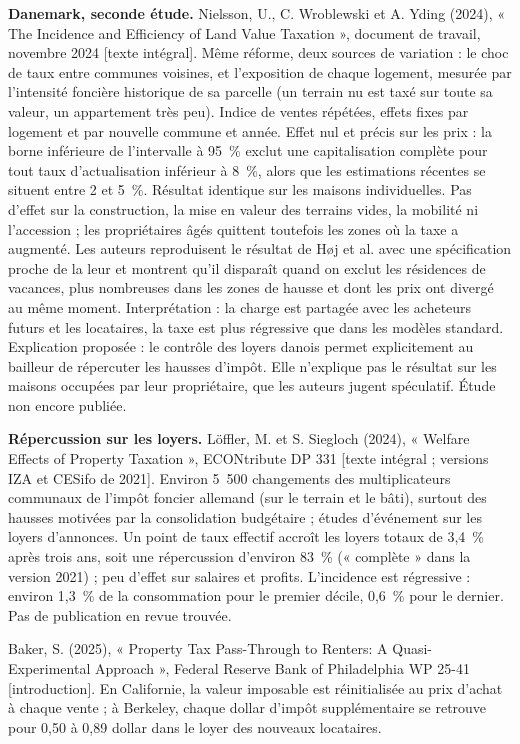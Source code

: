 \documentclass[11pt,a4paper]{article}
\newcommand{\lu}[1]{{\footnotesize\color{ocre}[#1]}}
\begin{document}
\textbf{Danemark, seconde étude.} Nielsson, U., C. Wroblewski et A. Yding (2024), « The Incidence
and Efficiency of Land Value Taxation », document de travail, novembre 2024 \lu{texte intégral}.
Même réforme, deux sources de variation : le choc de taux entre communes voisines, et
l'exposition de chaque logement, mesurée par l'intensité foncière historique de sa parcelle (un
terrain nu est taxé sur toute sa valeur, un appartement très peu). Indice de ventes répétées,
effets fixes par logement et par nouvelle commune et année. Effet nul et précis sur les prix : la
borne inférieure de l'intervalle à 95~\% exclut une capitalisation complète pour tout taux
d'actualisation inférieur à 8~\%, alors que les estimations récentes se situent entre 2 et 5~\%.
Résultat identique sur les maisons individuelles. Pas d'effet sur la construction, la mise en
valeur des terrains vides, la mobilité ni l'accession ; les propriétaires âgés quittent toutefois
les zones où la taxe a augmenté. Les auteurs reproduisent le résultat de Høj et al. avec une
spécification proche de la leur et montrent qu'il disparaît quand on exclut les résidences de
vacances, plus nombreuses dans les zones de hausse et dont les prix ont divergé au même moment.
Interprétation : la charge est partagée avec les acheteurs futurs et les locataires, la taxe est
plus régressive que dans les modèles standard. Explication proposée : le contrôle des loyers
danois permet explicitement au bailleur de répercuter les hausses d'impôt. Elle n'explique pas
le résultat sur les maisons occupées par leur propriétaire, que les auteurs jugent spéculatif.
Étude non encore publiée.

\textbf{Répercussion sur les loyers.} Löffler, M. et S. Siegloch (2024), « Welfare Effects of
Property Taxation », ECONtribute DP 331 \lu{texte intégral ; versions IZA et CESifo de 2021}.
Environ 5~500 changements des multiplicateurs communaux de l'impôt foncier allemand (sur le
terrain et le bâti), surtout des hausses motivées par la consolidation budgétaire ; études
d'événement sur les loyers d'annonces. Un point de taux effectif accroît les loyers totaux de
3,4~\% après trois ans, soit une répercussion d'environ 83~\% (« complète » dans la version 2021) ;
peu d'effet sur salaires et profits. L'incidence est régressive : environ 1,3~\% de la consommation
pour le premier décile, 0,6~\% pour le dernier. Pas de publication en revue trouvée.

Baker, S. (2025), « Property Tax Pass-Through to Renters: A Quasi-Experimental Approach »,
Federal Reserve Bank of Philadelphia WP 25-41 \lu{introduction}. En Californie, la valeur
imposable est réinitialisée au prix d'achat à chaque vente ; à Berkeley, chaque dollar d'impôt
supplémentaire se retrouve pour 0,50 à 0,89 dollar dans le loyer des nouveaux locataires.
\end{document}
